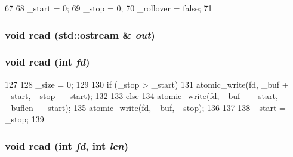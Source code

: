\begin{DoxyCode}
67 {
68     _start = 0;
69     _stop = 0;
70     _rollover = false;
71 }
\end{DoxyCode}
\hypertarget{classCircleBuf_affdc602556fb4fb51bfa307d5aa4f956}{
\subsubsection[{read}]{\setlength{\rightskip}{0pt plus 5cm}void read (std::ostream \& {\em out})}}
\label{classCircleBuf_affdc602556fb4fb51bfa307d5aa4f956}
\hypertarget{classCircleBuf_a7d3756c26077c588c877e36f8b3c94af}{
\subsubsection[{read}]{\setlength{\rightskip}{0pt plus 5cm}void read (int {\em fd})}}
\label{classCircleBuf_a7d3756c26077c588c877e36f8b3c94af}



\begin{DoxyCode}
127 {
128     _size = 0;
129 
130     if (_stop > _start) {
131         atomic_write(fd, _buf + _start, _stop - _start);
132     }
133     else {
134         atomic_write(fd, _buf + _start, _buflen - _start);
135         atomic_write(fd, _buf, _stop);
136     }
137 
138     _start = _stop;
139 }
\end{DoxyCode}
\hypertarget{classCircleBuf_a456a2875e76e14ea14f598f248506f21}{
\subsubsection[{read}]{\setlength{\rightskip}{0pt plus 5cm}void read (int {\em fd}, \/  int {\em len})}}
\label{classCircleBuf_a456a2875e76e14ea14f598f248506f21}



